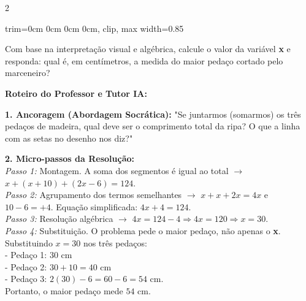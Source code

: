 \begin{multicols*}{2}
\begin{enunciadoLiteral}
\begin{center}
\begin{adjustbox}{trim=0cm 0cm 0cm 0cm, clip, max width=0.85\linewidth}
\end{adjustbox}
\end{center}

Com base na interpretação visual e algébrica, calcule o valor da variável \textbf{x} e responda: qual é, em centímetros, a medida do maior pedaço cortado pelo marceneiro?
\end{enunciadoLiteral}

\ifgabarito
    \begin{tcolorbox}[colback=CorTitUm!5, colframe=CorTitUm, boxrule=1pt, arc=4pt, left=6pt, right=6pt, top=6pt, bottom=6pt]
    \small\textbf{\textcolor{CorTitUm}{Roteiro do Professor e Tutor IA:}}\par\vspace{0.1cm}
    \color{CinzaEscuro}
    \textbf{1. Ancoragem (Abordagem Socrática):} "Se juntarmos (somarmos) os três pedaços de madeira, qual deve ser o comprimento total da ripa? O que a linha com as setas no desenho nos diz?"\par\vspace{0.1cm}
    
    \textbf{2. Micro-passos da Resolução:}\\
    \textit{Passo 1:} Montagem. A soma dos segmentos é igual ao total $\rightarrow$ $x + (x + 10) + (2x - 6) = 124$.\\
    \textit{Passo 2:} Agrupamento dos termos semelhantes $\rightarrow$ $x + x + 2x = 4x$ e $10 - 6 = +4$. Equação simplificada: $4x + 4 = 124$.\\
    \textit{Passo 3:} Resolução algébrica $\rightarrow$ $4x = 124 - 4 \Rightarrow 4x = 120 \Rightarrow x = 30$.\\
    \textit{Passo 4:} Substituição. O problema pede o maior pedaço, não apenas o \textbf{x}. Substituindo $x=30$ nos três pedaços:\\
    - Pedaço 1: $30 \text{ cm}$\\
    - Pedaço 2: $30 + 10 = 40 \text{ cm}$\\
    - Pedaço 3: $2(30) - 6 = 60 - 6 = 54 \text{ cm}$.\\
    Portanto, o maior pedaço mede $54 \text{ cm}$.\par\vspace{0.1cm}
    

\end{tcolorbox}
\end{multicols*}
